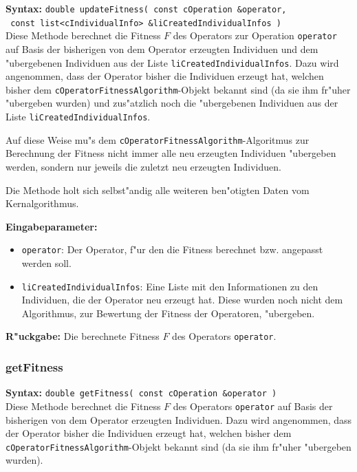 \textbf{Syntax:} \verb|double updateFitness( const cOperation &operator,| \\\verb| const list<cIndividualInfo> &liCreatedIndividualInfos )| \\

Diese Methode berechnet die Fitness $F$ des Operators zur Operation \verb|operator| auf Basis der bisherigen von dem Operator erzeugten Individuen und dem "ubergebenen Individuen aus der Liste \verb|liCreatedIndividualInfos|. Dazu wird angenommen, dass der Operator bisher die Individuen erzeugt hat, welchen bisher dem \verb|cOperatorFitnessAlgorithm|-Objekt bekannt sind (da sie ihm fr"uher "ubergeben wurden) und zus"atzlich noch die "ubergebenen Individuen aus der Liste \verb|liCreatedIndividualInfos|.

Auf diese Weise mu"s dem \verb|cOperatorFitnessAlgorithm|-Algoritmus zur Berechnung der Fitness nicht immer alle neu erzeugten Individuen "ubergeben werden, sondern nur jeweils die zuletzt neu erzeugten Individuen.

Die Methode holt sich selbst"andig alle weiteren ben"otigten Daten vom Kernalgorithmus.

\bigskip\noindent
\textbf{Eingabeparameter:}
\begin{itemize}
 \item \verb|operator|: Der Operator, f"ur den die Fitness berechnet bzw. angepasst werden soll.
 \item \verb|liCreatedIndividualInfos|: Eine Liste mit den Informationen zu den Individuen, die der Operator neu erzeugt hat. Diese wurden noch nicht dem Algorithmus, zur Bewertung der Fitness der Operatoren, "ubergeben.
\end{itemize}

\bigskip\noindent
\textbf{R"uckgabe:} Die berechnete Fitness $F$ des Operators \verb|operator|.


\subsubsection{getFitness}

\textbf{Syntax:} \verb|double getFitness( const cOperation &operator )| \\

Diese Methode berechnet die Fitness $F$ des Operators \verb|operator| auf Basis der bisherigen von dem Operator erzeugten Individuen. Dazu wird angenommen, dass der Operator bisher die Individuen erzeugt hat, welchen bisher dem \verb|cOperatorFitnessAlgorithm|-Objekt bekannt sind (da sie ihm fr"uher "ubergeben wurden).


